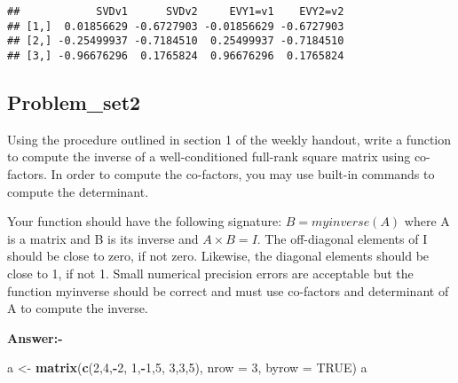 \documentclass[]{article}
\newenvironment{Shaded}{\begin{snugshade}}{\end{snugshade}}
\newcommand{\DataTypeTok}[1]{\textcolor[rgb]{0.13,0.29,0.53}{#1}}
\newcommand{\DecValTok}[1]{\textcolor[rgb]{0.00,0.00,0.81}{#1}}
\newcommand{\KeywordTok}[1]{\textcolor[rgb]{0.13,0.29,0.53}{\textbf{#1}}}
\newcommand{\NormalTok}[1]{#1}
\newcommand{\OperatorTok}[1]{\textcolor[rgb]{0.81,0.36,0.00}{\textbf{#1}}}
\newcommand{\OtherTok}[1]{\textcolor[rgb]{0.56,0.35,0.01}{#1}}
\newcommand{\StringTok}[1]{\textcolor[rgb]{0.31,0.60,0.02}{#1}}
\begin{document}
\begin{Shaded}
\end{Shaded}

\begin{verbatim}
##            SVDv1      SVDv2     EVY1=v1    EVY2=v2
## [1,]  0.01856629 -0.6727903 -0.01856629 -0.6727903
## [2,] -0.25499937 -0.7184510  0.25499937 -0.7184510
## [3,] -0.96676296  0.1765824  0.96676296  0.1765824
\end{verbatim}

\hypertarget{problem_set2}{%
\subsection{Problem\_set2}\label{problem_set2}}

Using the procedure outlined in section 1 of the weekly handout, write a
function to compute the inverse of a well-conditioned full-rank square
matrix using co-factors. In order to compute the co-factors, you may use
built-in commands to compute the determinant.

Your function should have the following signature: \(B = myinverse(A)\)
where A is a matrix and B is its inverse and \(A \times B = I\). The
off-diagonal elements of I should be close to zero, if not zero.
Likewise, the diagonal elements should be close to 1, if not 1. Small
numerical precision errors are acceptable but the function myinverse
should be correct and must use co-factors and determinant of A to
compute the inverse.

\textbf{Answer:-}

\begin{Shaded}
\begin{Highlighting}[]
\NormalTok{a <-}\StringTok{ }\KeywordTok{matrix}\NormalTok{(}\KeywordTok{c}\NormalTok{(}\DecValTok{2}\NormalTok{,}\DecValTok{4}\NormalTok{,}\OperatorTok{-}\DecValTok{2}\NormalTok{,}
              \DecValTok{1}\NormalTok{,}\OperatorTok{-}\DecValTok{1}\NormalTok{,}\DecValTok{5}\NormalTok{,}
              \DecValTok{3}\NormalTok{,}\DecValTok{3}\NormalTok{,}\DecValTok{5}\NormalTok{), }\DataTypeTok{nrow =} \DecValTok{3}\NormalTok{, }\DataTypeTok{byrow =} \OtherTok{TRUE}\NormalTok{)}
\NormalTok{a}
\end{Highlighting}
\end{Shaded}
\end{document}
